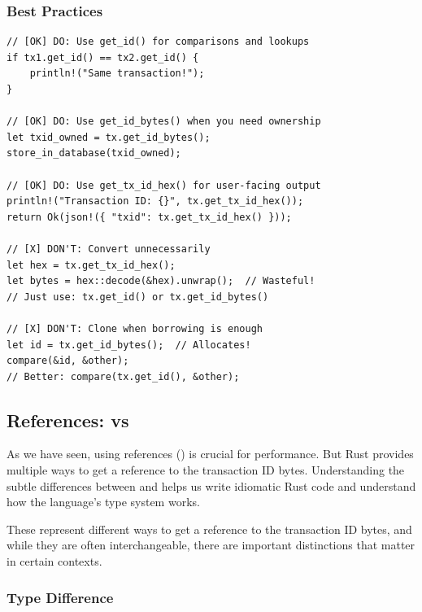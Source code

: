 \subsubsection{Best Practices}
\label{sec:ch06-txid-best-practices}

\begin{listing}[H]
\caption{Best practices for transaction ID methods}
\label{lst:ch06-10}
\begin{verbatim}
// [OK] DO: Use get_id() for comparisons and lookups
if tx1.get_id() == tx2.get_id() {
    println!("Same transaction!");
}

// [OK] DO: Use get_id_bytes() when you need ownership
let txid_owned = tx.get_id_bytes();
store_in_database(txid_owned);

// [OK] DO: Use get_tx_id_hex() for user-facing output
println!("Transaction ID: {}", tx.get_tx_id_hex());
return Ok(json!({ "txid": tx.get_tx_id_hex() }));

// [X] DON'T: Convert unnecessarily
let hex = tx.get_tx_id_hex();
let bytes = hex::decode(&hex).unwrap();  // Wasteful!
// Just use: tx.get_id() or tx.get_id_bytes()

// [X] DON'T: Clone when borrowing is enough
let id = tx.get_id_bytes();  // Allocates!
compare(&id, &other);
// Better: compare(tx.get_id(), &other);
\end{verbatim}
\end{listing}

\subsection{References:  vs }
\label{sec:ch06-references}

As we have seen, using references (\code{\&[u8]}) is crucial for performance. But Rust provides multiple ways to get a reference to the transaction ID bytes. Understanding the subtle differences between  and  helps us write idiomatic Rust code and understand how the language's type system works.

These represent different ways to get a reference to the transaction ID bytes, and while they are often interchangeable, there are important distinctions that matter in certain contexts.

\needspace{2in}
\subsubsection{Type Difference}
\label{sec:ch06-type-difference}

